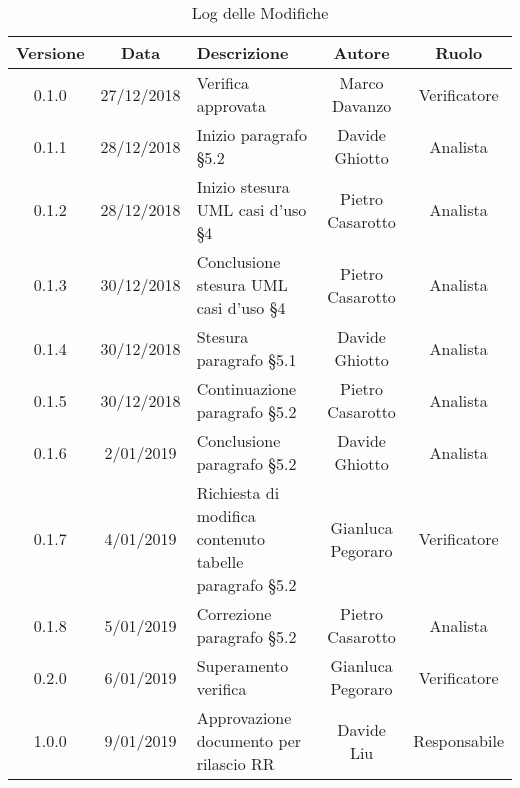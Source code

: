 \begin{table}[!h] %
            \centering
            \begin{tabular}{|c|c|p{5cm}|c|c|} %
                \rowcolor{orange!50} %
        		\hline
        		\textbf{Versione} & \textbf{Data} & \textbf{Descrizione} & \textbf{Autore} & \textbf{Ruolo} \\
                \hline
                0.1.0 & 27/12/2018 & Verifica approvata & Marco Davanzo & Verificatore \\
                \hline
                0.1.1 & 28/12/2018 & Inizio paragrafo §5.2 & Davide Ghiotto & Analista \\
                \hline
                0.1.2 & 28/12/2018 & Inizio stesura UML casi d'uso §4 & Pietro Casarotto & Analista \\
                \hline
                0.1.3 & 30/12/2018 & Conclusione stesura UML casi d’uso §4 & Pietro Casarotto & Analista \\
                \hline
                0.1.4 & 30/12/2018 & Stesura paragrafo §5.1 & Davide Ghiotto& Analista \\
                \hline
                0.1.5 & 30/12/2018 & Continuazione paragrafo §5.2 & Pietro Casarotto & Analista \\
                \hline
                0.1.6 & 2/01/2019 & Conclusione paragrafo §5.2 & Davide Ghiotto & Analista \\
                \hline
                0.1.7 & 4/01/2019 & Richiesta di modifica contenuto tabelle paragrafo §5.2 & Gianluca Pegoraro & Verificatore \\
                \hline
                0.1.8 & 5/01/2019 & Correzione paragrafo §5.2 & Pietro Casarotto & Analista \\
                \hline
                0.2.0 & 6/01/2019 & Superamento verifica & Gianluca Pegoraro & Verificatore \\
                \hline
                1.0.0 & 9/01/2019 & Approvazione documento per rilascio RR & Davide Liu & Responsabile \\
                \hline
        \end{tabular}
        \caption{Log delle Modifiche} %
        \label{tab:Log delle modifiche}
\end{table}

